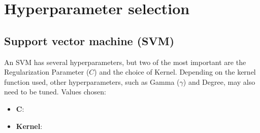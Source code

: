 \section{Hyperparameter selection}
\subsection{Support vector machine (SVM)}

An SVM has several hyperparameters, but two of the most important are the Regularization Parameter 
(\(C\)) and the choice of Kernel. Depending on the kernel function used, other hyperparameters, such as Gamma
(\(\gamma\)) and Degree, may also need to be tuned. Values chosen:

\begin{itemize}
    \item \textbf{\(\boldsymbol{C}\)}:
    \item \textbf{Kernel}:
\end{itemize}

